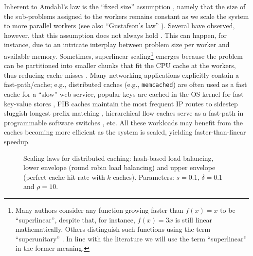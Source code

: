 Inherent to Amdahl's law is the ``fixed size'' assumption \cite{556383}, namely that the size of the sub-problems assigned to the workers remains constant as we scale the system to more parallel workers (see also ``Gustafson's law'' \cite{10.1145/42411.42415}). Several have observed, however, that this assumption does not always hold \cite{80148,556383}. This can happen, for instance, due to an intricate interplay between problem size per worker and available memory. Sometimes, superlinear scaling\footnote{Many authors consider any function growing faster than $f(x) = x$ to be ``superlinear'', despite that, for instance, $f(x) = 3x$ is still linear mathematically. Others distinguish such functions using the term ``superunitary'' \cite{80148}. In line with the literature we will use the term ``superlinear'' in the former meaning.} emerges because the problem can be partitioned into smaller chunks that fit the CPU cache at the workers, thus reducing cache misses \cite{7733347}. Many networking applications explicitly contain a fast-path\slash cache; e.g., distributed caches (e.g., \texttt{memcached}) are often used as a fast cache for a ``slow'' web service, popular keys are cached in the OS kernel for fast key-value stores \cite{179747, ghigoff2021bmc}, FIB caches maintain the most frequent IP routes to sidestep sluggish longest prefix matching \cite{rottenstreich2016optimal}, hierarchical flow caches serve as a fast-path in programmable software switches \cite{188960}, etc. All these workloads may benefit from the caches becoming more efficient as the system is scaled, yielding faster-than-linear speedup. %

\begin{figure}
  \centering
  \begin{small}
    
\end{small}
\caption{Scaling laws for distributed caching: hash-based load balancing, lower envelope (round robin load balancing) and upper envelope (perfect cache hit rate with $k$ caches). Parameters: $s=0.1$, $\delta=0.1$ and $\rho=10$.}
  \label{fig:dcache-analysis}
\end{figure}



